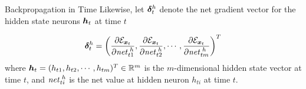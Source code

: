 \begin{frame}{Backpropagation in Time}
Likewise, let ${\bm \delta}^h_t$ denote the net gradient vector for the
hidden state neurons ${\boldsymbol h}_t$ at time $t$

\begin{align*}
    {\bm \delta}^h_t = \left(
        \frac{\partial {\mathcal E}_{{\boldsymbol x}_t}}{\partial \mathit{net}^{\;h}_{t1}},
        \frac{\partial {\mathcal E}_{{\boldsymbol x}_t}}{\partial \mathit{net}^{\;h}_{t2}},
                \cdots,
                \frac{\partial {\mathcal E}_{{\boldsymbol x}_t}}{\partial \mathit{net}^{\;h}_{tm}}
    \right)^T
\end{align*}
where ${\boldsymbol h}_t = (h_{t1}, h_{t2}, \cdots, h_{tm})^T \in {\mathord{\mathbb R}}^m$ is the
$m$-dimensional hidden state vector at time $t$, and $\mathit{net}^{\;h}_{ti}$ is
the net value at hidden neuron $h_{ti}$ at time $t$.
\end{frame}
%
